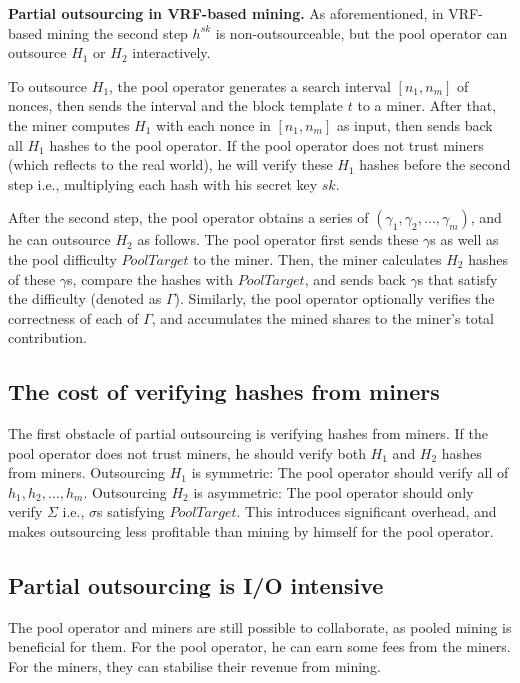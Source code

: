 \textbf{Partial outsourcing in VRF-based mining.}
As aforementioned, in VRF-based mining the second step $h^{sk}$ is non-outsourceable, but the pool operator can outsource $H_1$ or $H_2$ interactively.

To outsource $H_1$, the pool operator generates a search interval $[n_1, n_m]$ of nonces, then sends the interval and the block template $t$ to a miner.
After that, the miner computes $H_1$ with each nonce in $[n_1, n_m]$ as input, then sends back all $H_1$ hashes to the pool operator.
If the pool operator does not trust miners (which reflects to the real world), he will verify these $H_1$ hashes before the second step i.e., multiplying each hash with his secret key $sk$.

After the second step, the pool operator obtains a series of $(\gamma_1, \gamma_2, \dots, \gamma_m)$, and he can outsource $H_2$ as follows.
The pool operator first sends these $\gamma$s as well as the pool difficulty $PoolTarget$ to the miner.
Then, the miner calculates $H_2$ hashes of these $\gamma$s, compare the hashes with $PoolTarget$, and sends back $\gamma$s that satisfy the difficulty (denoted as $\Gamma$).
Similarly, the pool operator optionally verifies the correctness of each of $\Gamma$, and accumulates the mined shares to the miner's total contribution.


\subsection{The cost of verifying hashes from miners}

The first obstacle of partial outsourcing is verifying hashes from miners.
If the pool operator does not trust miners, he should verify both $H_1$ and $H_2$ hashes from miners.
Outsourcing $H_1$ is symmetric: The pool operator should verify all of $h_1, h_2, \dots, h_m$.
Outsourcing $H_2$ is asymmetric: The pool operator should only verify $\Sigma$ i.e., $\sigma$s satisfying $PoolTarget$.
This introduces significant overhead, and makes outsourcing less profitable than mining by himself for the pool operator.


\subsection{Partial outsourcing is I/O intensive}

The pool operator and miners are still possible to collaborate, as pooled mining is beneficial for them.
For the pool operator, he can earn some fees from the miners.
For the miners, they can stabilise their revenue from mining.

